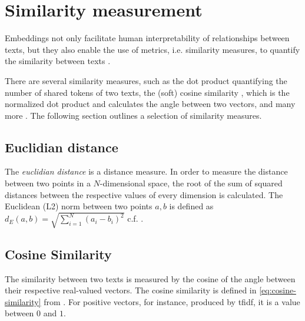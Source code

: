 \section{Similarity measurement}\label{sec:similarity-measurement}

Embeddings not only facilitate human interpretability of relationships between texts, 
but they also enable the use of metrics, i.e. similarity measures, to quantify the similarity between texts \cite{IR2011, euclidean_l2_norm2015}.

There are several similarity measures, such as the dot product quantifying the number of shared tokens of two texts, 
the (soft) cosine similarity \cite{soft_cosine2014, soft_cosine2017}, which is the normalized dot product and calculates the angle between two vectors, 
and many more \cite{IR2011, euclidean_l2_norm2015, HfsentTrans2019}.
The following section outlines a selection of similarity measures.


\subsection{Euclidian distance}\label{subsec:euclidian-distance}

The \textit{euclidian distance} is a distance measure.
In order to measure the distance between two points in a $N$-dimensional space, 
the root of the sum of squared distances between the respective values of every dimension is calculated.
The Euclidean (L2) norm between two points $a, b$ is defined as $d_E(a,b) = \sqrt{\sum_{i=1}^{N}(a_i - b_i)^2}$ c.f. \cite{euclidean_l2_norm2015}.


\subsection{Cosine Similarity}\label{subsec:cosine-similarity}


The similarity between two texts is measured by the cosine of the angle between their respective real-valued vectors.
The cosine similarity is defined in \autoref{eq:cosine-similarity} from \cite{soft_cosine2014}.
For positive vectors, for instance, produced by \ac{tfidf}, it is a value between $0$ and $1$.

